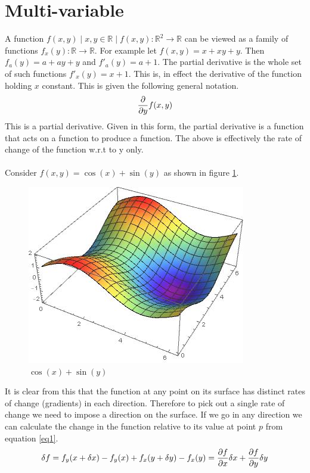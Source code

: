 \documentclass[a4paper]{article}
\begin{document}
\section{Multi-variable}
A function $f(x,y) \mid x,y \in \mathbb{R} \mid f(x,y):\mathbb{R}^2 \to \mathbb{R}$ can be viewed as a family of functions $f_x(y):\mathbb{R} \to \mathbb{R}$. For example let $f(x,y)=x+xy+y$. Then $f_a(y)=a+ay+y$ and $f'_a(y)=a+1$. The partial derivative is the whole set of such functions $f'_x(y) = x+1$. This is, in effect the derivative of the function holding $x$ constant. This is given the following general notation.
\begin{equation}
\pdv{}{y} f(x,y)
\end{equation}
This is a partial derivative. Given in this form, the partial derivative is a function that acts on a function to produce a function. The above is effectively the rate of change of the function w.r.t to y only. \\ \\
Consider $f(x,y) = \cos(x)+\sin(y)$ as shown in figure \ref{fig1}.
\begin{figure}[h!]
\centering
\includegraphics[scale=0.6]{wave.jpg}
\caption{$\cos(x)+ \sin(y)$}
\label{fig1}
\end{figure}
It is clear from this that the function at any point on its surface has distinct rates of change (gradients) in each direction. Therefore to pick out a single rate of change we need to impose a direction on the surface. If we go in any direction we can calculate the change in the function relative to its value at point $p$ from equation \ref{eq1}.
\begin{equation}
\delta f = f_y(x+\delta x)-f_y(x)+f_x(y+\delta y)-f_x(y)= \pdv{f}{x} \delta x + \pdv{f}{y} \delta y \label{eq2}
\end{equation}
\end{document}
